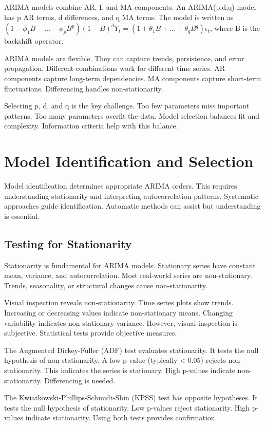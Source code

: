 ARIMA models combine AR, I, and MA components. An ARIMA(p,d,q) model has p AR terms, d differences, and q MA terms. The model is written as \((1-\phi_1 B - \ldots - \phi_p B^p)(1-B)^d Y_t = (1+\theta_1 B + \ldots + \theta_q B^q)\epsilon_t\), where B is the backshift operator.

ARIMA models are flexible. They can capture trends, persistence, and error propagation. Different combinations work for different time series. AR components capture long-term dependencies. MA components capture short-term fluctuations. Differencing handles non-stationarity.

Selecting p, d, and q is the key challenge. Too few parameters miss important patterns. Too many parameters overfit the data. Model selection balances fit and complexity. Information criteria help with this balance.

\section{Model Identification and Selection}

Model identification determines appropriate ARIMA orders. This requires understanding stationarity and interpreting autocorrelation patterns. Systematic approaches guide identification. Automatic methods can assist but understanding is essential.

\subsection{Testing for Stationarity}

Stationarity is fundamental for ARIMA models. Stationary series have constant mean, variance, and autocorrelation. Most real-world series are non-stationary. Trends, seasonality, or structural changes cause non-stationarity.

Visual inspection reveals non-stationarity. Time series plots show trends. Increasing or decreasing values indicate non-stationary means. Changing variability indicates non-stationary variance. However, visual inspection is subjective. Statistical tests provide objective measures.

The Augmented Dickey-Fuller (ADF) test evaluates stationarity. It tests the null hypothesis of non-stationarity. A low p-value (typically < 0.05) rejects non-stationarity. This indicates the series is stationary. High p-values indicate non-stationarity. Differencing is needed.

The Kwiatkowski-Phillips-Schmidt-Shin (KPSS) test has opposite hypotheses. It tests the null hypothesis of stationarity. Low p-values reject stationarity. High p-values indicate stationarity. Using both tests provides confirmation.

